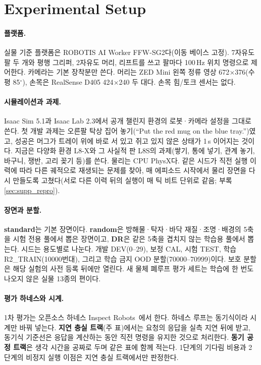 \section{Experimental Setup}
\label{sec:setup}

\paragraph{플랫폼.}
실물 기준 플랫폼은 ROBOTIS AI Worker FFW-SG2다(이동 베이스 고정). 7자유도 팔 두 개와 평행 그리퍼, 2자유도 머리, 리프트를 쓰고 팔마다 100\,Hz 위치 명령으로 제어한다. 카메라는 기본 장착분만 쓴다. 머리는 ZED Mini 왼쪽 정류 영상 672$\times$376(수평 85$^\circ$), 손목은 RealSense D405 424$\times$240 두 대다. 손목 힘/토크 센서는 없다.

\paragraph{시뮬레이션과 과제.}
Isaac Sim 5.1과 Isaac Lab 2.3에서 공개 챌린지 환경의 로봇·카메라 설정을 그대로 쓴다. 첫 개발 과제는 오른팔 탁상 집어 놓기(``Put the red mug on the blue tray.'')였고, 성공은 머그가 트레이 위에 바로 서 있고 쥐고 있지 않은 상태가 1\,s 이어지는 것이다. 지금은 다양화 환경 L8-X와 그 사실적 판 L8S의 과제(쌓기, 통에 넣기, 관계 놓기, 바구니, 쟁반, 고리 꽂기 등)를 쓴다. 물리는 CPU PhysX다. 같은 시드가 직전 실행 이력에 따라 다른 궤적으로 재생되는 문제를 찾아, 매 에피소드 시작에서 물리 장면을 다시 만들도록 고쳤다(서로 다른 이력 뒤의 실행이 매 틱 비트 단위로 같음; 부록 \cref{sec:supp_repro}).

\paragraph{장면과 분할.}
\textbf{standard}는 기본 장면이다. \textbf{random}은 방해물·탁자·바닥 재질·조명·배경의 5축을 시험 전용 풀에서 뽑은 장면이고, \textbf{DR}은 같은 5축을 겹치지 않는 학습용 풀에서 뽑는다. 시드는 용도별로 나눈다. 개발 DEV(0--29), 보정 CAL, 시험 TEST, 학습 R2\_TRAIN(10000번대), 그리고 학습 금지 OOD 분할(70000--70999)이다. 보호 분할은 해당 실험의 사전 등록 뒤에만 열린다. 새 물체 폐루프 평가 세트는 학습에 한 번도 나오지 않은 실물 13종의 편이다.

\paragraph{평가 하네스와 시계.}
1차 평가는 오픈소스 하네스 Inspect Robots~\cite{inspectrobots2026}에서 한다. 하네스 루프는 동기식이라 시계만 바꿔 넣는다. \textbf{지연 충실 트랙}(주 표)에서는 요청의 응답을 실측 지연 뒤에 받고, 동기식 기준선은 응답을 계산하는 동안 직전 명령을 유지한 것으로 처리한다. \textbf{동기 공정 트랙}은 생각 시간을 공짜로 두며 같은 표에 함께 적는다. 1단계의 기다림 비용과 2단계의 비정지 실행 이점은 지연 충실 트랙에서만 판정한다.

